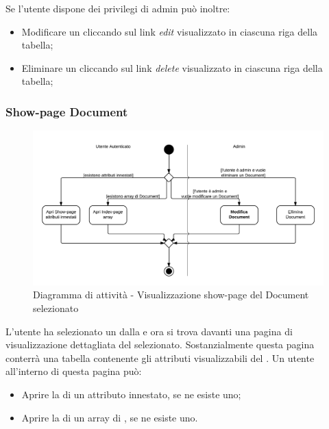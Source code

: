 Se l'utente dispone dei privilegi di admin può inoltre:

\begin{itemize}

	\item Modificare un  cliccando sul link \textit{edit} visualizzato in ciascuna riga della tabella;
	\item Eliminare un  cliccando sul link \textit{delete} visualizzato in ciascuna riga della tabella;

\end{itemize}

\subsubsection{Show-page Document}

\begin{figure}[H]
\centering
\includegraphics[scale=0.2]{uml/attivita/MaaP - Show-page.png}
\caption{Diagramma di attività - Visualizzazione show-page del Document selezionato}
\end{figure}

L'utente ha selezionato un  dalla  e ora si trova davanti una pagina di visualizzazione dettagliata del  selezionato. Sostanzialmente questa pagina conterrà una tabella contenente gli attributi visualizzabili del . Un utente all'interno di questa pagina può:

\begin{itemize}

	\item Aprire la  di un attributo innestato, se ne esiste uno;
	\item Aprire la  di un array di , se ne esiste uno.

\end{itemize}

